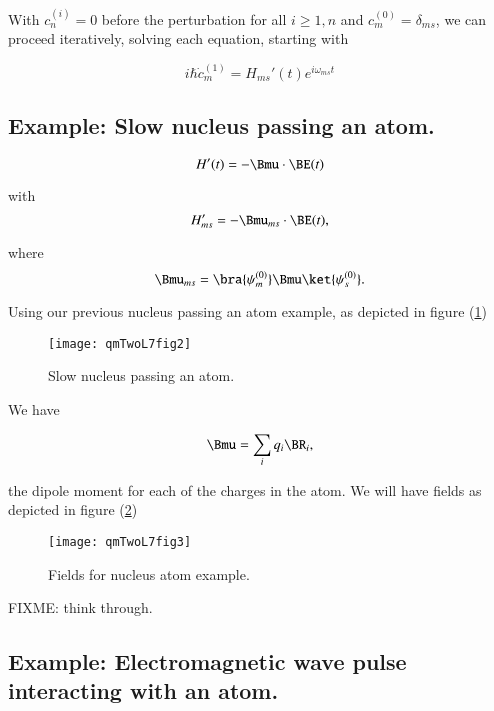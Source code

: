With $c_n^{(i)} = 0$ before the perturbation for all $i \ge 1, n$ and $c_m^{(0)} = \delta_{ms}$, we can proceed iteratively, solving each equation, starting with

\begin{equation}\label{eqn:qmTwoL7:490}
i \hbar \dot{c}_m^{(1)} = H_{ms}'(t) e^{i \omega_{ms} t}
\end{equation}

\subsection{Example: Slow nucleus passing an atom.}

\begin{equation}\label{eqn:qmTwoL7:510}
H'(t) = - \Bmu \cdot \BE(t)
\end{equation}

with
\begin{equation}\label{eqn:qmTwoL7:530}
H_{ms}' = -\Bmu_{ms} \cdot \BE(t),
\end{equation}

where
\begin{equation}\label{eqn:qmTwoL7:550}
\Bmu_{ms} =
\bra{\psi_m^{(0)}}
\Bmu
\ket{\psi_s^{(0)}}.
\end{equation}

Using our previous nucleus passing an atom example, as depicted in figure (\ref{fig:qmTwoL7fig2})

\begin{figure}[htp]
\centering
\texttt{[image: qmTwoL7fig2]}
\caption{Slow nucleus passing an atom.}\label{fig:qmTwoL7fig2}
\end{figure}

We have

\begin{equation}\label{eqn:qmTwoL7:570}
\Bmu = \sum_i q_i \BR_i,
\end{equation}

the dipole moment for each of the charges in the atom.  We will have fields as depicted in figure (\ref{fig:qmTwoL7fig3})

\begin{figure}[htp]
\centering
\texttt{[image: qmTwoL7fig3]}
\caption{Fields for nucleus atom example.}\label{fig:qmTwoL7fig3}
\end{figure}

FIXME: think through.

\subsection{Example: Electromagnetic wave pulse interacting with an atom.}

